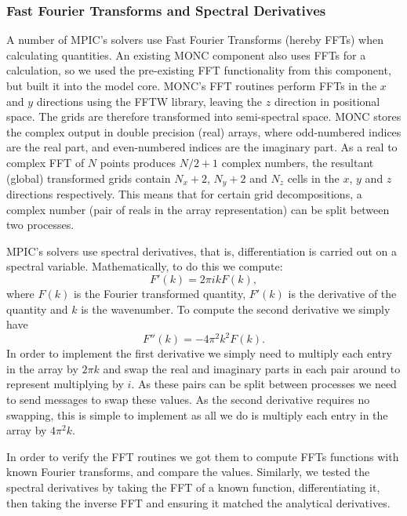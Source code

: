 \documentclass{article}
\begin{document}
\subsubsection{Fast Fourier Transforms and Spectral Derivatives}
A number of MPIC's solvers use Fast Fourier Transforms (hereby FFTs) when calculating quantities. An existing MONC component also uses FFTs for a calculation, so we used the pre-existing FFT functionality from this component, but built it into the model core. MONC's FFT routines perform FFTs in the $x$ and $y$ directions using the FFTW library, leaving the $z$ direction in positional space. The grids are therefore transformed into semi-spectral space. MONC stores the complex output in double precision (real) arrays, where odd-numbered indices are the real part, and even-numbered indices are the imaginary part. As a real to complex FFT of $N$ points produces $N/2+1$ complex numbers, the resultant (global) transformed grids contain $N_x+2$, $N_y+2$ and $N_z$ cells in the $x$, $y$ and $z$ directions respectively. This means that for certain grid decompositions, a complex number (pair of reals in the array representation) can be split between two processes.

MPIC's solvers use spectral derivatives, that is, differentiation is carried out on a spectral variable. Mathematically, to do this we compute:
\begin{equation}
  F'(k) = 2\pi i k F(k),
\end{equation}
where $F(k)$ is the Fourier transformed quantity, $F'(k)$ is the derivative of the quantity and $k$ is the wavenumber. To compute the second derivative we simply have
\begin{equation}
  F''(k) = -4\pi^2 k^2 F(k).
\end{equation}
In order to implement the first derivative we simply need to multiply each entry in the array by $2 \pi k$ and swap the real and imaginary parts in each pair around to represent multiplying by $i$. As these pairs can be split between processes we need to send messages to swap these values. As the second derivative requires no swapping, this is simple to implement as all we do is multiply each entry in the array by $4 \pi^2 k$.

In order to verify the FFT routines we got them to compute FFTs functions with known Fourier transforms, and compare the values. Similarly, we tested the spectral derivatives by taking the FFT of a known function, differentiating it, then taking the inverse FFT and ensuring it matched the analytical derivatives.
\end{document}
